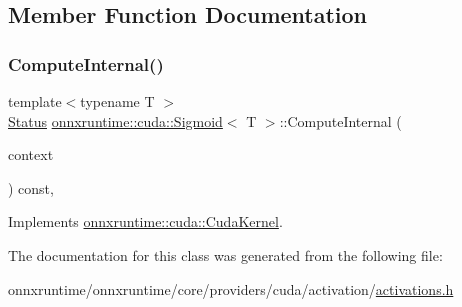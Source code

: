 \subsection{Member Function Documentation}
\mbox{\label{classonnxruntime_1_1cuda_1_1Sigmoid_a0ffe8b56e588d6132241e59515dbdff6}} 
\subsubsection{\texorpdfstring{Compute\+Internal()}{ComputeInternal()}}
{\footnotesize\ttfamily template$<$typename T $>$ \\
\mbox{\hyperlink{classonnxruntime_1_1common_1_1Status}{Status}} \mbox{\hyperlink{classonnxruntime_1_1cuda_1_1Sigmoid}{onnxruntime\+::cuda\+::\+Sigmoid}}$<$ T $>$\+::Compute\+Internal (\begin{DoxyParamCaption}\item[{\mbox{\hyperlink{classonnxruntime_1_1OpKernelContext}{Op\+Kernel\+Context}} $\ast$}]{context }\end{DoxyParamCaption}) const\hspace{0.3cm}{\ttfamily [override]}, {\ttfamily [virtual]}}



Implements \mbox{\hyperlink{classonnxruntime_1_1cuda_1_1CudaKernel_aca7af04ae448017d6023d30bba231ebb}{onnxruntime\+::cuda\+::\+Cuda\+Kernel}}.



The documentation for this class was generated from the following file\+:\begin{DoxyCompactItemize}
\item 
onnxruntime/onnxruntime/core/providers/cuda/activation/\mbox{\hyperlink{cuda_2activation_2activations_8h}{activations.\+h}}\end{DoxyCompactItemize}
